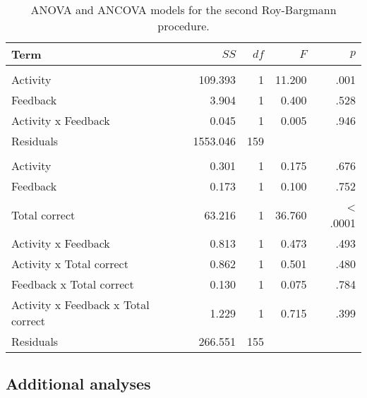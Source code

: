 \documentclass[../main.tex]{subfiles}
\begin{document}
\begin{table*}[t]

\caption{\label{tab:rb2Table}\label{rb2-table}ANOVA and ANCOVA models for the second Roy-Bargmann
                     procedure.}
\centering
\begin{tabular}{lrrrr}
\toprule
Term & $SS$ & $df$ & $F$ & $p$\\
\midrule
\addlinespace[0.3em]
\multicolumn{5}{l}{\textbf{ANOVA}}\\
\hspace{1em}Activity & 109.393 & 1 & 11.200 & .001\\
\hspace{1em}Feedback & 3.904 & 1 & 0.400 & .528\\
\hspace{1em}Activity x Feedback & 0.045 & 1 & 0.005 & .946\\
\hspace{1em}Residuals & 1553.046 & 159 &  & \\
\addlinespace[0.3em]
\multicolumn{5}{l}{\textbf{ANCOVA}}\\
\hspace{1em}Activity & 0.301 & 1 & 0.175 & .676\\
\hspace{1em}Feedback & 0.173 & 1 & 0.100 & .752\\
\hspace{1em}Total correct & 63.216 & 1 & 36.760 & < .0001\\
\hspace{1em}Activity x Feedback & 0.813 & 1 & 0.473 & .493\\
\hspace{1em}Activity x Total correct & 0.862 & 1 & 0.501 & .480\\
\hspace{1em}Feedback x Total correct & 0.130 & 1 & 0.075 & .784\\
\hspace{1em}Activity x Feedback x Total correct & 1.229 & 1 & 0.715 & .399\\
\hspace{1em}Residuals & 266.551 & 155 &  & \\
\bottomrule
\end{tabular}
\end{table*}

\hypertarget{additional-analyses}{%
\subsection{Additional analyses}\label{additional-analyses}}
\end{document}
